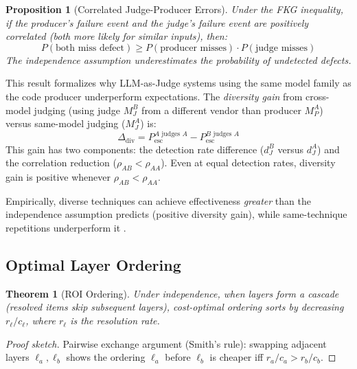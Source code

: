 \documentclass[11pt, a4paper]{googledeepmind}
\newtheorem{theorem}{Theorem}[section]
\newtheorem{proposition}{Proposition}[section]
\begin{document}
\begin{proposition}[Correlated Judge-Producer Errors]
\label{prop:fkg}
Under the FKG inequality, if the producer's failure event and the judge's failure event are positively correlated (both more likely for similar inputs), then:
\begin{equation}
    P(\text{both miss defect}) \geq P(\text{producer misses}) \cdot P(\text{judge misses})
\end{equation}
The independence assumption \emph{underestimates} the probability of undetected defects.
\end{proposition}

This result formalizes why LLM-as-Judge systems using the same model family as the code producer underperform expectations. The \emph{diversity gain} from cross-model judging (using judge $M_J^B$ from a different vendor than producer $M_P^A$) versus same-model judging ($M_J^A$) is:
\begin{equation}
\Delta_{\mathrm{div}} = P_{\mathrm{esc}}^{A \text{ judges } A} - P_{\mathrm{esc}}^{B \text{ judges } A}
\end{equation}
This gain has two components: the detection rate difference ($d_J^B$ versus $d_J^A$) and the correlation reduction ($\rho_{AB} < \rho_{AA}$). Even at equal detection rates, diversity gain is positive whenever $\rho_{AB} < \rho_{AA}$.

Empirically, diverse techniques can achieve effectiveness \emph{greater} than the independence assumption predicts (positive diversity gain), while same-technique repetitions underperform it \citep{littlewood2000}.

\subsection{Optimal Layer Ordering}

\begin{theorem}[ROI Ordering]
\label{thm:roi-ordering}
Under independence, when layers form a cascade (resolved items skip subsequent layers), cost-optimal ordering sorts by decreasing $r_\ell / c_\ell$, where $r_\ell$ is the resolution rate.
\end{theorem}

\begin{proof}[Proof sketch]
Pairwise exchange argument (Smith's rule): swapping adjacent layers $\ell_a, \ell_b$ shows the ordering $\ell_a$ before $\ell_b$ is cheaper iff $r_a / c_a > r_b / c_b$.
\end{proof}
\end{document}
